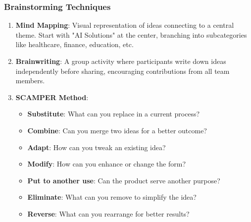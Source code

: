 \documentclass[aspectratio=169]{beamer}
\begin{document}
\begin{frame}[fragile]
    \frametitle{Brainstorming Techniques}
    \begin{enumerate}
        \item \textbf{Mind Mapping}: Visual representation of ideas connecting to a central theme. Start with "AI Solutions" at the center, branching into subcategories like healthcare, finance, education, etc.
        \item \textbf{Brainwriting}: A group activity where participants write down ideas independently before sharing, encouraging contributions from all team members.
        \item \textbf{SCAMPER Method}:
        \begin{itemize}
            \item \textbf{Substitute}: What can you replace in a current process?
            \item \textbf{Combine}: Can you merge two ideas for a better outcome?
            \item \textbf{Adapt}: How can you tweak an existing idea?
            \item \textbf{Modify}: How can you enhance or change the form?
            \item \textbf{Put to another use}: Can the product serve another purpose?
            \item \textbf{Eliminate}: What can you remove to simplify the idea?
            \item \textbf{Reverse}: What can you rearrange for better results?
        \end{itemize}
    \end{enumerate}
\end{frame}
\end{document}
